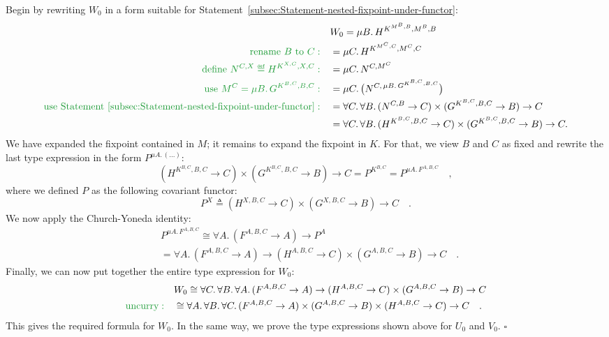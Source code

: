 Begin by rewriting $W_{0}$ in a form suitable for Statement~\ref{subsec:Statement-nested-fixpoint-under-functor}:
\begin{align*}
 & W_{0}=\mu B.\,H^{K^{M^{B},B},M^{B},B}\\
{\color{greenunder}\text{rename }B\text{ to }C:}\quad & =\mu C.\,H^{K^{M^{C},C},M^{C},C}\\
{\color{greenunder}\text{define }N^{C,X}\triangleq H^{K^{X,C},X,C}:}\quad & =\mu C.\,N^{C,M^{C}}\\
{\color{greenunder}\text{use }M^{C}=\mu B.\,G^{K^{B,C},B,C}:}\quad & =\mu C.\,\big(N^{C,\,\mu B.\,G^{K^{B,C},B,C}}\big)\\
{\color{greenunder}\text{use Statement \ref{subsec:Statement-nested-fixpoint-under-functor}}:}\quad & =\forall C.\,\forall B.\,(N^{C,B}\rightarrow C)\times(G^{K^{B,C},B,C}\rightarrow B)\rightarrow C\\
 & =\forall C.\,\forall B.\,(H^{K^{B,C},B,C}\rightarrow C)\times(G^{K^{B,C},B,C}\rightarrow B)\rightarrow C.
\end{align*}
We have expanded the fixpoint contained in $M$; it remains to expand
the fixpoint in $K$. For that, we view $B$ and $C$ as fixed and
rewrite the last type expression in the form $P^{\mu A.\,(...)}$:
\[
(H^{K^{B,C},B,C}\rightarrow C)\times(G^{K^{B,C},B,C}\rightarrow B)\rightarrow C=P^{K^{B,C}}=P^{\mu A.\,F^{A,B,C}}\quad,
\]
where we defined $P$ as the following covariant functor:
\[
P^{X}\triangleq(H^{X,B,C}\rightarrow C)\times(G^{X,B,C}\rightarrow B)\rightarrow C\quad.
\]
We now apply the Church-Yoneda identity:
\begin{align*}
 & P^{\mu A.\,F^{A,B,C}}\cong\forall A.\,(F^{A,B,C}\rightarrow A)\rightarrow P^{A}\\
 & =\forall A.\,(F^{A,B,C}\rightarrow A)\rightarrow(H^{A,B,C}\rightarrow C)\times(G^{A,B,C}\rightarrow B)\rightarrow C\quad.
\end{align*}
Finally, we can now put together the entire type expression for $W_{0}$:
\begin{align*}
 & W_{0}\cong\forall C.\,\forall B.\,\forall A.\,(F^{A,B,C}\rightarrow A)\rightarrow(H^{A,B,C}\rightarrow C)\times(G^{A,B,C}\rightarrow B)\rightarrow C\\
{\color{greenunder}\text{uncurry}:}\quad & \cong\forall A.\,\forall B.\,\forall C.\,(F^{A,B,C}\rightarrow A)\times(G^{A,B,C}\rightarrow B)\times(H^{A,B,C}\rightarrow C)\rightarrow C\quad.
\end{align*}
This gives the required formula for $W_{0}$. In the same way, we
prove the type expressions shown above for $U_{0}$ and $V_{0}$.
$\square$

